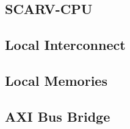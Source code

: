 \documentclass{scarv-report}
\begin{document}
\subsection{SCARV-CPU}

\subsection{Local Interconnect}

\subsection{Local Memories}

\subsection{AXI Bus Bridge}


\MKEPILOGUE

\end{document}
